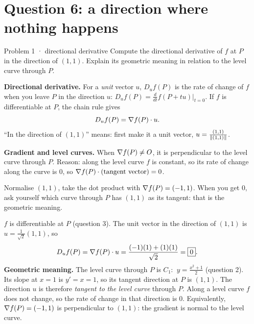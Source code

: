\section{Question 6: a direction where nothing happens}

\begin{question}{Problem 1 \;·\; directional derivative}
Compute the directional derivative of $f$ at $P$ in the direction of $(1,1)$. Explain its
geometric meaning in relation to the level curve through $P$.
\end{question}

\begin{lesson}
\textbf{Directional derivative.} For a \emph{unit} vector $u$, $D_uf(P)$ is the rate of change of
$f$ when you leave $P$ in the direction $u$:
$D_uf(P)=\frac{d}{dt}f(P+tu)\big|_{t=0}$. If $f$ is differentiable at $P$, the chain rule gives
\[
  D_uf(P)=\nabla f(P)\cdot u .
\]
``In the direction of $(1,1)$'' means: first make it a unit vector, $u=\frac{(1,1)}{\left\lVert (1,1)\right\rVert}$.

\textbf{Gradient and level curves.} When $\nabla f(P)\ne O$, it is perpendicular to the level curve
through $P$. Reason: along the level curve $f$ is constant, so its rate of change along the curve
is $0$, so $\nabla f(P)\cdot(\text{tangent vector})=0$.
\end{lesson}

\begin{howto}
Normalise $(1,1)$, take the dot product with $\nabla f(P)=(-1,1)$. When you get $0$, ask yourself
which curve through $P$ has $(1,1)$ as its tangent: that is the geometric meaning.
\end{howto}

\begin{answer}
$f$ is differentiable at $P$ (question 3). The unit vector in the direction of $(1,1)$ is
$u=\frac1{\sqrt2}(1,1)$, so
\[
  D_uf(P)=\nabla f(P)\cdot u=\frac{(-1)(1)+(1)(1)}{\sqrt2}=\boxed{0}.
\]
\textbf{Geometric meaning.} The level curve through $P$ is $C_1$: $\ y=\frac{x^2+1}2$ (question 2).
Its slope at $x=1$ is $y'=x=1$, so its tangent direction at $P$ is $(1,1)$. The direction $u$ is
therefore \emph{tangent to the level curve} through $P$. Along a level curve $f$ does not change,
so the rate of change in that direction is $0$. Equivalently, $\nabla f(P)=(-1,1)$ is perpendicular to
$(1,1)$: the gradient is normal to the level curve.
\end{answer}

